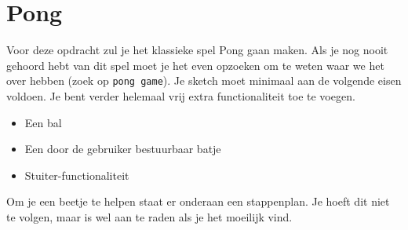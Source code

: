 \documentclass[../syllabus.tex]{subfiles}
\begin{document}
\section{Pong}
Voor deze opdracht zul je het klassieke spel Pong gaan maken. Als je nog nooit gehoord hebt van dit spel moet je het even opzoeken om te weten waar we het over hebben (zoek op \texttt{pong game}). Je sketch moet minimaal aan de volgende eisen voldoen. Je bent verder helemaal vrij extra functionaliteit toe te voegen. 
\begin{itemize}
    \item Een bal
    \item Een door de gebruiker bestuurbaar batje
    \item Stuiter-functionaliteit
\end{itemize}
Om je een beetje te helpen staat er onderaan een stappenplan. Je hoeft dit niet te volgen, maar is wel aan te raden als je het moeilijk vind.
    
\end{document}

